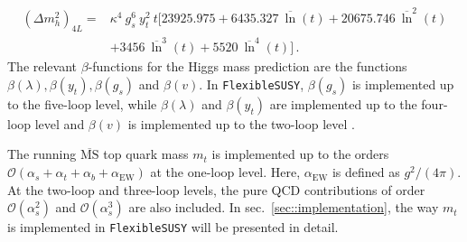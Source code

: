 \documentclass[a4paper,12pt]{book}
\begin{document}
\begin{align}
\nonumber
(\Delta m_h^2)_{4L} ={}& \kappa^4\>g_s^6\>y_t^2\>t \biggl[23925.975+6435.327\>\overline{\ln}(t)+20675.746\>\overline{\ln}^2(t)\\
\label{eq::dmh4L}
&+3456\>\overline{\ln}^3(t)+5520\>\overline{\ln}^4(t)\biggr]\,.
\end{align}
The relevant $\beta$-functions for the Higgs mass prediction are the functions $\beta(\lambda),\beta(y_t),\beta(g_s)$ and $\beta(v)$. In \texttt{FlexibleSUSY}, $\beta(g_s)$ is implemented up to the five-loop level, while $\beta(\lambda)$ and $\beta(y_t)$ are implemented up to the four-loop level and $\beta(v)$ is implemented up to the two-loop level \cite{beta1,beta2,beta3,beta4,beta5,martinHiggs4L,beta7,beta8,beta9}.\par 
The running $\overline{\text{MS}}$ top quark mass $m_t$ is implemented up to the orders $\mathcal{O}(\alpha_s+\alpha_t+\alpha_b+\alpha_\text{EW})$ at the one-loop level. Here, $\alpha_\text{EW}$ is defined as $g^2/(4\pi)$. At the two-loop and three-loop levels, the pure QCD contributions of order $\mathcal{O}(\alpha_s^2)$ and $\mathcal{O}(\alpha_s^3)$ are also included. In sec.\ \ref{sec::implementation}, the way $m_t$ is implemented in \texttt{FlexibleSUSY} will be presented in detail. 
\end{document}
